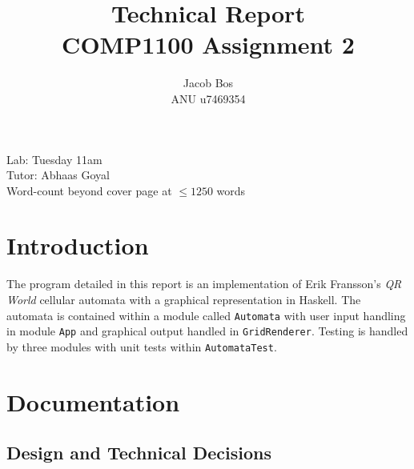 \documentclass[11pt]{article}
\title{Technical Report\\ COMP1100 Assignment 2}
\author{Jacob Bos\\ ANU u7469354}
\begin{document}
\maketitle
{}
\begin{center}
  Lab: Tuesday 11am\\
  Tutor: Abhaas Goyal\\
  Word-count beyond cover page at $\leq 1250$ words
\end{center}
\tableofcontents
\newpage
{}
\section*{Introduction} 
The program detailed in this report is an implementation of Erik Fransson's \textit{QR World} cellular automata with a graphical representation in Haskell. The automata is contained within a module called \verb|Automata| with user input handling in module \verb|App| and graphical output handled in \verb|GridRenderer|. Testing is handled by three modules with unit tests within \verb|AutomataTest|.


\section{Documentation}%
\subsection{Design and Technical Decisions}
\end{document}
